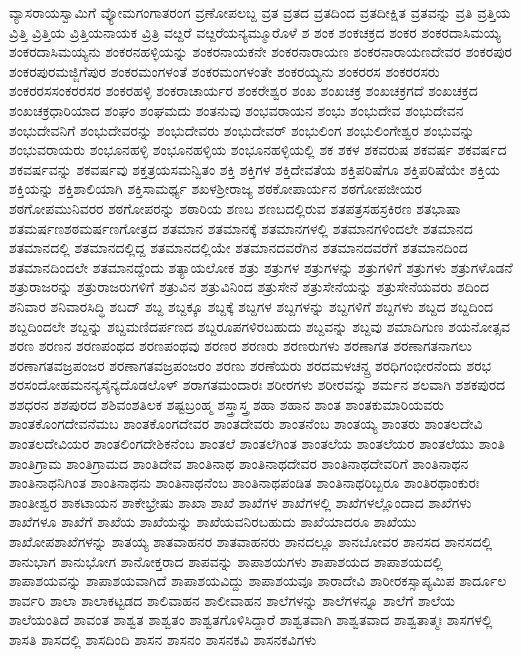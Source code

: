 {ವ್ಯಾಸರಾಯಸ್ವಾಮಿಗೆ
ವ್ಯೋಮಗಂಗಾತರಂಗ
ವ್ರಣೋಪಲಬ್ದ
ವ್ರತ
ವ್ರತದ
ವ್ರತದಿಂದ
ವ್ರತದೀಕ್ಷಿತ
ವ್ರತವನ್ನು
ವ್ರತಿ
ವ್ರತ್ತಿಯ
ವ್ರಿತ್ತಿ
ವ್ರಿತ್ತಿಯ
ವ್ರಿತ್ತಿಯನಾಯಕ
ವ್ರಿತ್ರಿ
ವೞ್ದರೆ
ವೞ್ದರೆಯನ್ಯಮ್ಮೂರೊಳೆ
ಶ
ಶಂಕ
ಶಂಕಚಕ್ರದ
ಶಂಕರ
ಶಂಕರದಾಸಿಮಯ್ಯ
ಶಂಕರದಾಸಿಮಯ್ಯನು
ಶಂಕರನಹಳ್ಳಿಯನ್ನು
ಶಂಕರನಾಯಕನೇ
ಶಂಕರನಾರಾಯಣ
ಶಂಕರನಾರಾಯಣದೇವರ
ಶಂಕರಪುರ
ಶಂಕರಪುರಮಜ್ಜಿಗೆಪುರ
ಶಂಕರಮಂಗಳಂತೆ
ಶಂಕರಮಂಗಳಂತೇ
ಶಂಕರಯ್ಯನು
ಶಂಕರರಸ
ಶಂಕರರಸರು
ಶಂಕರರಸಸಂಕರರಸರ
ಶಂಕರಹಳ್ಳಿ
ಶಂಕರಾಚಾರ್ಯರ
ಶಂಕರೇಶ್ವರ
ಶಂಖ
ಶಂಖಚಕ್ರ
ಶಂಖಚಕ್ರಗದೆ
ಶಂಖಚಕ್ರದ
ಶಂಖಚಕ್ರಧಾರಿಯಾದ
ಶಂಘಂ
ಶಂಘಮದು
ಶಂತನುವು
ಶಂಭವರಾಯನ
ಶಂಭು
ಶಂಭುದೇವ
ಶಂಭುದೇವನ
ಶಂಭುದೇವನಿಗೆ
ಶಂಭುದೇವರನ್ನು
ಶಂಭುದೇವರು
ಶಂಭುದೇವರ್
ಶಂಭುಲಿಂಗ
ಶಂಭುಲಿಂಗೇಶ್ವರ
ಶಂಭುವನ್ನು
ಶಂಭುವರಾಯರು
ಶಂಭೂನಹಳ್ಳಿ
ಶಂಭೂನಹಳ್ಳಿಯ
ಶಂಭೂನಹಳ್ಳಿಯಲ್ಲಿ
ಶಕ
ಶಕಳ
ಶಕವರುಷ
ಶಕವರ್ಷ
ಶಕವರ್ಷದ
ಶಕವರ್ಷವನ್ನು
ಶಕವರ್ಷವು
ಶಕ್ತತ್ರಯಸಮನ್ವಿತಂ
ಶಕ್ತಿ
ಶಕ್ತಿಗಳ
ಶಕ್ತಿದೇವತೆಯ
ಶಕ್ತಿಪರಿಷೆಗೂ
ಶಕ್ತಿಪರಿಷೆಯೇ
ಶಕ್ತಿಯ
ಶಕ್ತಿಯನ್ನು
ಶಕ್ತಿಶಾಲಿಯಾಗಿ
ಶಕ್ತಿಸಾಮರ್ಥ್ಯ
ಶಖಳಶ್ರೀರಾಜ್ಯ
ಶಠಕೋಪಾರ್ಯನ
ಶಠಗೋಪಜೀಯರ
ಶಠಗೋಪಮುನಿವರರ
ಶಠಗೋಪರನ್ನು
ಶಠಾರಿಯ
ಶಣಬ
ಶಣಬದಲ್ಲಿರುವ
ಶತಪತ್ರಸಹಸ್ರಕಿರಣ
ಶತಭಾಷಾ
ಶತಮರ್ಷಣಶಠಮರ್ಷಣಗೋತ್ರದ
ಶತಮಾನ
ಶತಮಾನಕ್ಕೆ
ಶತಮಾನಗಳಲ್ಲಿ
ಶತಮಾನಗಳಿಂದಲೇ
ಶತಮಾನದ
ಶತಮಾನದಲ್ಲಿ
ಶತಮಾನದಲ್ಲಿದ್ದ
ಶತಮಾನದಲ್ಲಿಯೇ
ಶತಮಾನದವರೆಗಿನ
ಶತಮಾನದವರೆಗೆ
ಶತಮಾನದಿಂದ
ಶತಮಾನದಿಂದಲೇ
ಶತಮಾನದ್ದೆಂದು
ಶತ್ಯಾಯಲೋಕ
ಶತ್ರು
ಶತ್ರುಗಳ
ಶತ್ರುಗಳನ್ನು
ಶತ್ರುಗಳಿಗೆ
ಶತ್ರುಗಳು
ಶತ್ರುಗಳೊಡನೆ
ಶತ್ರುರಾಜರನ್ನು
ಶತ್ರುರಾಜರುಗಳಿಗೆ
ಶತ್ರುವಿನ
ಶತ್ರುವಿನಿಂದ
ಶತ್ರುಸೇನೆ
ಶತ್ರುಸೇನೆಯನ್ನು
ಶತ್ರುಸೇನೆಯವರು
ಶದಿಂದ
ಶನಿವಾರ
ಶನಿವಾರಸಿದ್ಧಿ
ಶಬದ್
ಶಬ್ದ
ಶಬ್ದಕ್ಕೂ
ಶಬ್ದಕ್ಕೆ
ಶಬ್ದಗಳ
ಶಬ್ದಗಳನ್ನು
ಶಬ್ದಗಳಿಗೆ
ಶಬ್ದಗಳು
ಶಬ್ದದ
ಶಬ್ದದಿಂದ
ಶಬ್ದದಿಂದಲೇ
ಶಬ್ದನ್ನು
ಶಬ್ದಮಣಿದರ್ಪಣದ
ಶಬ್ದರೂಪಗಳಿರಬಹುದು
ಶಬ್ದವನ್ನು
ಶಬ್ದವು
ಶಮಾದಿಗುಣ
ಶಯನೋತ್ಸವ
ಶರಣ
ಶರಣನ
ಶರಣಪಂಥದ
ಶರಣಪಂಥವು
ಶರಣರ
ಶರಣರು
ಶರಣರುಗಳು
ಶರಣಾಗತ
ಶರಣಾಗತನಾಗಲು
ಶರಣಾಗತವಜ್ರಪಂಜರ
ಶರಣಾಗತವಜ್ರಪಂಜರಂ
ಶರಣು
ಶರಣೆಯರು
ಶರದಮಳಚನ್ದ್ರ
ಶರಧಿಗಂಭೀರನೆಂದು
ಶರಭ
ಶರಸಂದೋಹಮನನ್ಯಸೈನ್ಯದೊಡಲೊಳ್
ಶರಾಗತಮಂದಾರಃ
ಶರೀರಗಳು
ಶರೀರವನ್ನು
ಶರ್ಮನ
ಶಲವಾಗಿ
ಶಶಕಪುರದ
ಶಶಧರನ
ಶಶಪುರದ
ಶಶಿವಂಶತಿಲಕ
ಶಷ್ಟಬ್ರಂಹ್ಮ
ಶಸ್ತ್ರಾಸ್ತ್ರ
ಶಹಾ
ಶಹಾನ
ಶಾಂತ
ಶಾಂತಕುಮಾರಿಯವರು
ಶಾಂತಕೊಂಗದೇವನೆಮಬ
ಶಾಂತಕೊಂಗದೇವರ
ಶಾಂತದೇವರು
ಶಾಂತನೆಂಬ
ಶಾಂತಯ್ಯ
ಶಾಂತರು
ಶಾಂತಲದೇವಿ
ಶಾಂತಲದೇವಿಯರ
ಶಾಂತಲಿಂಗದೇಶಿಕನೆಂಬ
ಶಾಂತಲೆ
ಶಾಂತಲೆಗಿಂತ
ಶಾಂತಲೆಯ
ಶಾಂತಲೆಯರ
ಶಾಂತಲೆಯು
ಶಾಂತಿ
ಶಾಂತಿಗ್ರಾಮ
ಶಾಂತಿಗ್ರಾಮದ
ಶಾಂತಿದೇವ
ಶಾಂತಿನಾಥ
ಶಾಂತಿನಾಥದೇವರ
ಶಾಂತಿನಾಥದೇವರಿಗೆ
ಶಾಂತಿನಾಥನ
ಶಾಂತಿನಾಥನಿಗಿಂತ
ಶಾಂತಿನಾಥನು
ಶಾಂತಿನಾಥನೆಂಬ
ಶಾಂತಿನಾಥಪಂಡಿತ
ಶಾಂತಿನಾಥರಿಬ್ಬರೂ
ಶಾಂತಿರಥಾಂಕುರಃ
ಶಾಂತೀಶ್ವರ
ಶಾಕಟಾಯನ
ಶಾಕೇಭ್ರೇಷು
ಶಾಖಾ
ಶಾಖೆ
ಶಾಖೆಗಳ
ಶಾಖೆಗಳಲ್ಲಿ
ಶಾಖೆಗಳಲ್ಲೊಂದಾದ
ಶಾಖೆಗಳು
ಶಾಖೆಗಳೂ
ಶಾಖೆಗೆ
ಶಾಖೆಯ
ಶಾಖೆಯನ್ನು
ಶಾಖೆಯವನಿರಬಹುದು
ಶಾಖೆಯಾದರೂ
ಶಾಖೆಯು
ಶಾಖೋಪಶಾಖೆಗಳನ್ನು
ಶಾತಯ್ಯ
ಶಾತವಾಹನರ
ಶಾತವಾಹನರು
ಶಾನದಲ್ಲೂ
ಶಾನಬೋವರ
ಶಾನಸದ
ಶಾನಸದಲ್ಲಿ
ಶಾನುಭಾಗ
ಶಾನುಭೋಗ
ಶಾನೋಕ್ತರಾದ
ಶಾಪವನ್ನು
ಶಾಪಾಶಯಗಳು
ಶಾಪಾಶಯದ
ಶಾಪಾಶಯದಲ್ಲಿ
ಶಾಪಾಶಯವನ್ನು
ಶಾಪಾಶಯವಾಗಿದೆ
ಶಾಪಾಶಯವಿದ್ದು
ಶಾಪಾಶಯವೂ
ಶಾರಾದೇವಿ
ಶಾರೀರಕಸ್ಸಾಪ್ಯಮಿಪ
ಶಾರ್ದೂಲ
ಶಾರ್ವರಿ
ಶಾಲಾ
ಶಾಲಾಕಟ್ಟಡದ
ಶಾಲಿವಾಹನ
ಶಾಲೀವಾಹನ
ಶಾಲೆಗಳನ್ನು
ಶಾಲೆಗಳನ್ನೂ
ಶಾಲೆಗೆ
ಶಾಲೆಯ
ಶಾಲೆಯಂತಿದೆ
ಶಾವಂತ
ಶಾಶ್ವತ
ಶಾಶ್ವತಂ
ಶಾಶ್ವತಗೊಳಿಸಿದ್ದಾರೆ
ಶಾಶ್ವತವಾಗಿ
ಶಾಶ್ವತವಾದ
ಶಾಶ್ವತಾತ್ಮಃ
ಶಾಸಗಳಲ್ಲಿ
ಶಾಸತಿ
ಶಾಸದಲ್ಲಿ
ಶಾಸದಿಂದಿ
ಶಾಸನ
ಶಾಸನಂ
ಶಾಸನಕವಿ
ಶಾಸನಕವಿಗಳು
}
